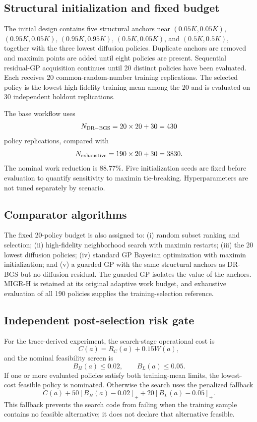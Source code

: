 \documentclass[preprint,12pt]{elsarticle}
\begin{document}
\subsection{Structural initialization and fixed budget}

The initial design contains five structural anchors near $(0.05K,0.05K)$, $(0.95K,0.05K)$, $(0.95K,0.95K)$, $(0.5K,0.05K)$, and $(0.5K,0.5K)$, together with the three lowest diffusion policies. Duplicate anchors are removed and maximin points are added until eight policies are present. Sequential residual-GP acquisition continues until 20 distinct policies have been evaluated. Each receives 20 common-random-number training replications. The selected policy is the lowest high-fidelity training mean among the 20 and is evaluated on 30 independent holdout replications.

The base workflow uses
\[
N_{\rm DR-BGS}=20\times20+30=430
\]
policy replications, compared with
\[
N_{\rm exhaustive}=190\times20+30=3830.
\]
The nominal work reduction is 88.77\%. Five initialization seeds are fixed before evaluation to quantify sensitivity to maximin tie-breaking. Hyperparameters are not tuned separately by scenario.

\subsection{Comparator algorithms}

The fixed 20-policy budget is also assigned to: (i) random subset ranking and selection; (ii) high-fidelity neighborhood search with maximin restarts; (iii) the 20 lowest diffusion policies; (iv) standard GP Bayesian optimization with maximin initialization; and (v) a guarded GP with the same structural anchors as DR-BGS but no diffusion residual. The guarded GP isolates the value of the anchors. MIGR-H is retained at its original adaptive work budget, and exhaustive evaluation of all 190 policies supplies the training-selection reference.


\subsection{Independent post-selection risk gate}
\label{sec:riskgate}

For the trace-derived experiment, the search-stage operational cost is
\[
C(a)=R_C(a)+0.15W(a),
\]
and the nominal feasibility screen is
\[
B_H(a)\le 0.02,\qquad B_L(a)\le 0.05.
\]
If one or more evaluated policies satisfy both training-mean limits, the lowest-cost feasible policy is nominated. Otherwise the search uses the penalized fallback
\[
C(a)+50[B_H(a)-0.02]_+ +20[B_L(a)-0.05]_+.
\]
This fallback prevents the search code from failing when the training sample contains no feasible alternative; it does not declare that alternative feasible.
\end{document}

